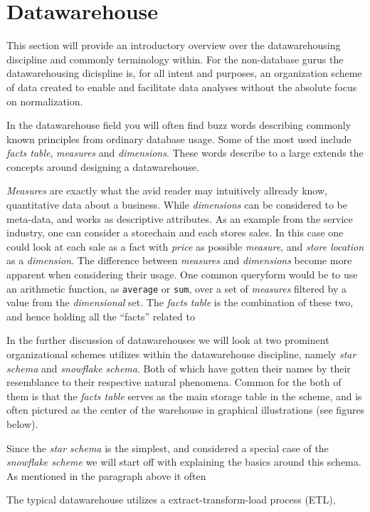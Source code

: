 \section{Datawarehouse}
	\noindent
	This section will provide an introductory overview over the datawarehousing discipline and commonly terminology within. 
	For the non-database gurus the datawarehousing dicispline is, for all intent and purposes, an organization scheme of
	data created to enable and facilitate data analyses without the absolute focus on normalization.
	\cite{wiki:normalization, wiki:datawarehouse}
	
	\bigskip\noindent
	In the datawarehouse field you will often find buzz words describing commonly known principles from ordinary database
	usage. Some of the most used include \textit{facts table}, \textit{measures} and \textit{dimensions}.
	These words describe to a large extends the concepts around designing a datawarehouse. 
	
	\bigskip\noindent
	\textit{Measures} are exactly what the avid reader may intuitively allready know, quantitative data about a business.
	While \textit{dimensions} can be considered to be meta-data, and works as descriptive attributes. 
	As an example from the service industry, one can consider a storechain and each stores sales. 
	In this case one could look at each sale as a fact with \textit{price} as possible \textit{measure},
	and \textit{store location} as a \textit{dimension}. 
	The difference between \textit{measures} and \textit{dimensions} become more apparent when considering their usage.
	One common queryform would be to use an arithmetic function, as \texttt{average} or \texttt{sum}, over a set of
	\textit{measures} filtered by a value from the \textit{dimensional} set.
	The \textit{facts table} is the combination of these two, and hence holding all the "`facts"' related to 
	
	
	\bigskip\noindent
	In the further discussion of datawarehouses we will look at two prominent organizational schemes utilizes 
	within the datawarehouse discipline, namely \textit{star schema} and \textit{snowflake schema}. 
	Both of which have gotten their names by their resemblance to their respective natural phenomena.
	Common for the both of them is that the \textit{facts table} serves as the main storage table in the scheme, 
	and is often pictured as the center of the warehouse in graphical illustrations (see figures below). 
	
	\bigskip\noindent
	Since the \textit{star schema} is the simplest, and considered a special case of the \textit{snowflake scheme}
	we will start off with explaining the basics around this schema. 
	As mentioned in the paragraph above it often
	
	
	
	
	The typical datawarehouse utilizes a extract-transform-load process (ETL), 

	